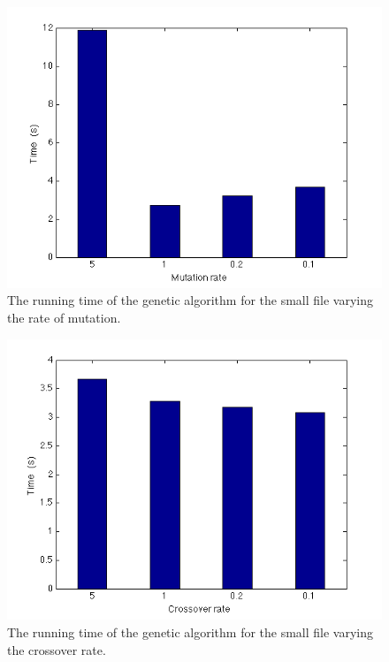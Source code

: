 \documentclass[titlepage,a4paper]{article}
\begin{document}
\begin{figure}[H]
  \begin{center}
    \includegraphics[scale=0.5]{../results/figures/genetic_mutation.png}
  \end{center}
  \caption{The running time of the genetic algorithm for the small file varying the rate of mutation.}
  \label{genetic_pop}
\end{figure}

\begin{figure}[H]
  \begin{center}
    \includegraphics[scale=0.5]{../results/figures/genetic_crossover.png}
  \end{center}
  \caption{The running time of the genetic algorithm for the small file varying the crossover rate.}
  \label{genetic_pop}
\end{figure}
\end{document}
